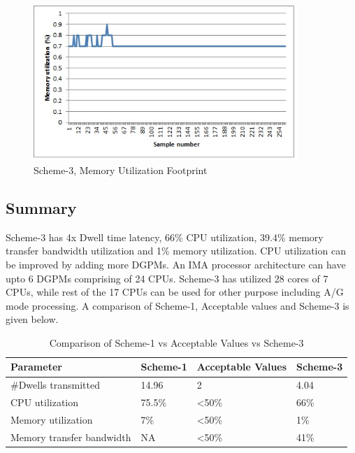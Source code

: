 \begin{figure}[h!]
	\centering
	\includegraphics[width=100mm]{figures/scheme4_mem_util}
	\caption{Scheme-3, Memory Utilization Footprint}
	\label{fig:mm:scheme4_mem_util}
\end{figure}
\FloatBarrier

\subsection{Summary}
\label{ss:mm:scheme4:summary}
Scheme-3 has 4x Dwell time latency, 66\% CPU utilization, 39.4\% memory transfer bandwidth utilization and 1\% memory utilization. CPU utilization can be improved by adding more DGPMs. An IMA processor architecture can have upto 6 DGPMs comprising of 24 CPUs. Scheme-3 has utilized 28 cores of 7 CPUs, while rest of the 17 CPUs can be used for other purpose including A/G mode processing. A comparison of Scheme-1, Acceptable values and Scheme-3 is given below.

\begin{table}[h!]
	\centering
	\begin{tabular}{|l|l|l|l|} 
	 \hline
	 \textbf{Parameter} & \textbf{Scheme-1} & \textbf{Acceptable Values} & \textbf{Scheme-3}\\
	 \hline
	 \#Dwells transmitted &  14.96 & 2 & 4.04 \\ \hline
	 CPU utilization & 75.5\% & \textless 50\% & 66\% \\ \hline
	 Memory utilization & 7\% & \textless 50\%  & 1\% \\ \hline
	 Memory transfer bandwidth & NA & \textless 50\% & 41\%  \\ \hline
	\end{tabular}
	\caption{Comparison of Scheme-1 vs Acceptable Values vs Scheme-3}
	\label{tbl:mm:scheme4_comparison}
\end{table}

\clearpage
